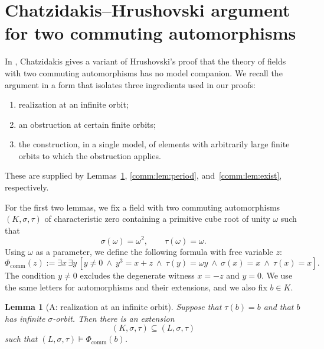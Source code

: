 \documentclass[11pt,a4paper]{amsart}
\newtheorem{lemma}[theorem]{Lemma}
\theoremstyle{definition}
\begin{document}
\section{Chatzidakis--Hrushovski argument for two commuting automorphisms}\label{sec:chatzidakis-argument}

In \cite[Section~1.11]{Survey}, Chatzidakis gives a variant of
Hrushovski's proof that the theory of fields with two commuting
automorphisms has no model companion. We recall the argument in a
form that isolates three ingredients used in our proofs:
\begin{enumerate}
  \item[(A)] realization at an infinite orbit;
  \item[(B)]  an obstruction at certain finite
orbits;
  \item[(C)] the construction, in a single model, of elements with
arbitrarily large finite orbits to which the obstruction applies.
\end{enumerate}
These are supplied by Lemmas~\ref{comm:lem:infinite},
\ref{comm:lem:period}, and~\ref{comm:lem:exist}, respectively.


For the first two lemmas, we fix a field with two commuting
automorphisms $(K,\sigma,\tau)$ of characteristic zero containing
a primitive cube root of unity $\omega$ such that
\[
  \sigma(\omega)=\omega^2,\qquad \tau(\omega)=\omega.
\]
Using $\omega$ as a parameter, we define the following formula
with free variable $z$:
\[
  \Phi_{\mathrm{comm}}(z):=
  \exists x\,\exists y\,
  \left[
    y\ne0
    \ \wedge\ y^3=x+z
    \ \wedge\ \tau(y)=\omega y
    \ \wedge\ \sigma(x)=x
    \ \wedge\ \tau(x)=x
  \right].
\]
The condition $y\ne0$ excludes the degenerate witness
$x=-z$ and $y=0$.
We use the same letters for automorphisms and their extensions, and we also fix $b\in K$.

\begin{lemma}[A: realization at an infinite orbit]
\label{comm:lem:infinite}
Suppose that $\tau(b)=b$ and that $b$ has infinite
$\sigma$-orbit. Then there is an extension
\[
  (K,\sigma,\tau)\subseteq(L,\sigma,\tau)
\]
such that $(L,\sigma,\tau)\models\Phi_{\mathrm{comm}}(b)$.
\end{lemma}
\end{document}
